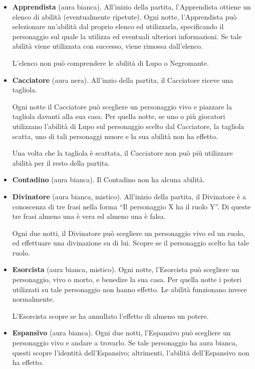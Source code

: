 \documentclass[a4paper,10pt]{article}
\begin{document}
\begin{itemize}

	\item {\bf Apprendista} (aura bianca). All'inizio della partita, l'Apprendista ottiene un elenco di abilità (eventualmente ripetute). Ogni notte, l'Apprendista può selezionare un'abilità dal proprio elenco ed utilizzarla, specificando il personaggio sul quale la utilizza ed eventuali ulteriori informazioni. Se tale abilità viene utilizzata con successo, viene rimossa dall'elenco.

	      L'elenco non può comprendere le abilità di Lupo o Negromante.

	\item {\bf Cacciatore} (aura nera). All'inzio della partita, il Cacciatore riceve una tagliola.

	      Ogni notte il Cacciatore può scegliere un personaggio vivo e piazzare la tagliola davanti alla sua casa. Per quella notte, se uno o più giocatori utilizzano l'abilità di Lupo sul personaggio scelto dal Cacciatore, la tagliola scatta, uno di tali personaggi muore e la sua abilità non ha effetto.

	      Una volta che la tagliola è scattata, il Cacciatore non può più utilizzare abilità per il resto della partita.

	\item {\bf Contadino} (aura bianca). Il Contadino non ha alcuna abilità.

	\item {\bf Divinatore} (aura bianca, mistico). All'inizio della partita, il Divinatore è a conoscenza di tre frasi nella forma ``Il personaggio X ha il ruolo Y''. Di queste tre frasi almeno una è vera ed almeno una è falsa.

	      Ogni due notti, il Divinatore può scegliere un personaggio vivo ed un ruolo, ed effettuare una divinazione su di lui. Scopre se il personaggio scelto ha tale ruolo.

	\item {\bf Esorcista} (aura bianca, mistico). Ogni notte, l'Esorcista può scegliere un personaggio, vivo o morto, e benedire la sua casa. Per quella notte i poteri utilizzati su tale personaggio non hanno effetto. Le abilità funzionano invece normalmente.

	      L'Esorcista scopre se ha annullato l'effetto di almeno un potere.

	\item {\bf Espansivo} (aura bianca). Ogni due notti, l'Espansivo può scegliere un personaggio vivo e andare a trovarlo. Se tale personaggio ha aura bianca, questi scopre l'identità dell'Espansivo; altrimenti, l'abilità dell'Espansivo non ha effetto.


\end{itemize}
\end{document}

